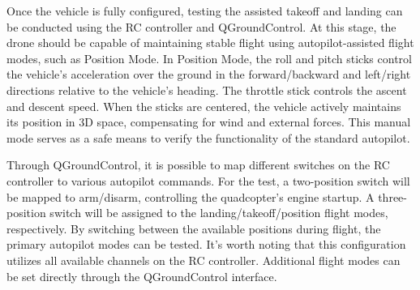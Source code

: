 Once the vehicle is fully configured, testing the assisted takeoff and landing can be conducted using the RC controller and QGroundControl. At this stage, the drone should be capable of maintaining stable flight using autopilot-assisted flight modes, such as Position Mode. In Position Mode, the roll and pitch sticks control the vehicle's acceleration over the ground in the forward/backward and left/right directions relative to the vehicle's heading. The throttle stick controls the ascent and descent speed. When the sticks are centered, the vehicle actively maintains its position in 3D space, compensating for wind and external forces. This manual mode serves as a safe means to verify the functionality of the standard autopilot.

Through QGroundControl, it is possible to map different switches on the RC controller to various autopilot commands. For the test, a two-position switch will be mapped to arm/disarm, controlling the quadcopter's engine startup. A three-position switch will be assigned to the landing/takeoff/position flight modes, respectively. By switching between the available positions during flight, the primary autopilot modes can be tested. It's worth noting that this configuration utilizes all available channels on the RC controller. Additional flight modes can be set directly through the QGroundControl interface.

